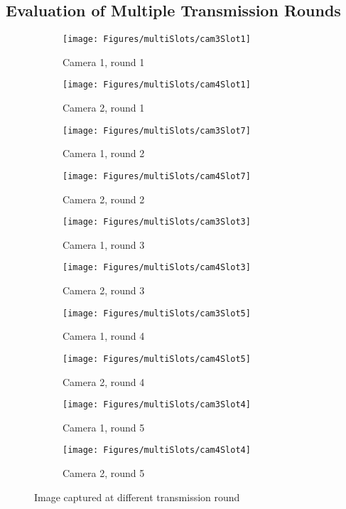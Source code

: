 \subsection{Evaluation of Multiple Transmission Rounds}
\begin{figure}
\begin{center}
\begin{subfigure}[b]{0.4\columnwidth}
\texttt{[image: Figures/multiSlots/cam3Slot1]}
\caption{Camera 1, round 1}
\end{subfigure}
\begin{subfigure}[b]{0.4\columnwidth}
\texttt{[image: Figures/multiSlots/cam4Slot1]}
\caption{Camera 2, round 1}
\end{subfigure}
%
\begin{subfigure}[b]{0.4\columnwidth}
\texttt{[image: Figures/multiSlots/cam3Slot7]}
\caption{Camera 1, round 2}
\end{subfigure}
\begin{subfigure}[b]{0.4\columnwidth}
\texttt{[image: Figures/multiSlots/cam4Slot7]}
\caption{Camera 2, round 2}
\end{subfigure}
%
\begin{subfigure}[b]{0.4\columnwidth}
\texttt{[image: Figures/multiSlots/cam3Slot3]}
\caption{Camera 1, round 3}
\end{subfigure}
\begin{subfigure}[b]{0.4\columnwidth}
\texttt{[image: Figures/multiSlots/cam4Slot3]}
\caption{Camera 2, round 3}
\end{subfigure}
%
\begin{subfigure}[b]{0.4\columnwidth}
\texttt{[image: Figures/multiSlots/cam3Slot5]}
\caption{Camera 1, round 4}
\end{subfigure}
\begin{subfigure}[b]{0.4\columnwidth}
\texttt{[image: Figures/multiSlots/cam4Slot5]}
\caption{Camera 2, round 4}
\end{subfigure}
%
\begin{subfigure}[b]{0.4\columnwidth}
\texttt{[image: Figures/multiSlots/cam3Slot4]}
\caption{Camera 1, round 5}
\end{subfigure}
\begin{subfigure}[b]{0.4\columnwidth}
\texttt{[image: Figures/multiSlots/cam4Slot4]}
\caption{Camera 2, round 5}
\end{subfigure}
\caption{\label{fig::imgCapMultiSlots} Image captured at different transmission round}
\end{center}
\end{figure}

